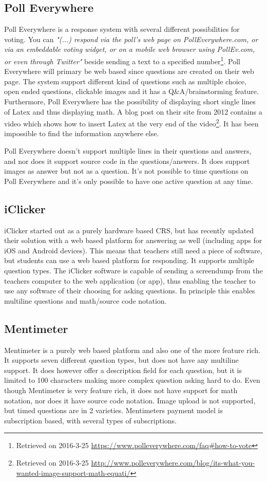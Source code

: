 \subsection*{Poll Everywhere}
Poll Everywhere is a response system with several different possibilities for voting. You can \emph{"(...) respond via the poll's web page on PollEverywhere.com, or via an embeddable voting widget, or on a mobile web browser using PollEv.com, or even through Twitter"} beside sending a text to a specified number\footnote{Retrieved on 2016-3-25 \url{https://www.polleverywhere.com/faq\#how-to-vote}}. Poll Everywhere will primary be web based since questions are created on their web page. The system support different kind of questions such as multiple choice, open ended questions, clickable images and it has a Q\&A/brainstorming feature. Furthermore, Poll Everywhere has the possibility of displaying short single lines of Latex and thus displaying math. A blog post on their site from 2012 contains a video which shows how to insert Latex at the very end of the video\footnote{Retrieved on 2016-3-25 \url{http://www.polleverywhere.com/blog/its-what-you-wanted-image-support-math-equati/}}. It has been impossible to find the information anywhere else.

Poll Everywhere doesn't support multiple lines in their questions and answers, and nor does it support source code in the questions/answers. It does support images as answer but not as a question. It's not possible to time questions on Poll Everywhere and it's only possible to have one active question at any time. 

\subsection*{iClicker}
iClicker started out as a purely hardware based CRS, but has recently updated their solution with a web based platform for answering as well (including apps for iOS and Android devices). This means that teachers still need a piece of software, but students can use a web based platform for responding. It supports multiple question types. The iClicker software is capable of sending a screendump from the teachers computer to the web application (or app), thus enabling the teacher to use any software of their choosing for asking questions. In principle this enables multiline questions and math/source code notation. 

\subsection*{Mentimeter}
Mentimeter is a purely web based platform and also one of the more feature rich. It supports seven different question types, but does not have any multiline support. It does however offer a description field for each question, but it is limited to 100 characters making more complex question asking hard to do. Even though Mentimeter is very feature rich, it does not have support for math notation, nor does it have source code notation.  Image upload is not supported, but timed questions are in 2 varieties. Mentimeters payment model is subscription based, with several types of subscriptions. 

